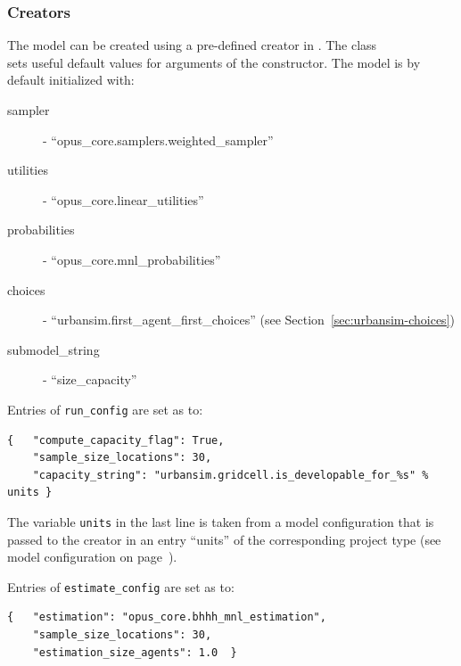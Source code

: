 \subsubsection{Creators}
%
The model can be created using a pre-defined creator in .
The class\\
  
sets useful default
values for arguments of the constructor. The model is by default initialized with:
\begin{description}
\item[sampler] - ``opus_core.samplers.weighted_sampler''
\item[utilities] - ``opus_core.linear_utilities''
\item[probabilities] - ``opus_core.mnl_probabilities''
\item[choices] - ``urbansim.first_agent_first_choices'' (see
  Section~\ref{sec:urbansim-choices})
\item[submodel_string] - ``size_capacity''
\end{description}
Entries of \verb|run_config| are set as to:
\begin{verbatim}
{   "compute_capacity_flag": True,
    "sample_size_locations": 30,
    "capacity_string": "urbansim.gridcell.is_developable_for_%s" % units }
\end{verbatim}
The variable \variablesindex \verb|units| in the last line is taken from a model configuration
that is passed to the creator in an entry ``units'' of the corresponding
project type (see model configuration on
page~\pageref{page:model-configuration}).

Entries of \verb|estimate_config| are set as to:
\begin{verbatim}
{   "estimation": "opus_core.bhhh_mnl_estimation",
    "sample_size_locations": 30,
    "estimation_size_agents": 1.0  }
\end{verbatim}


